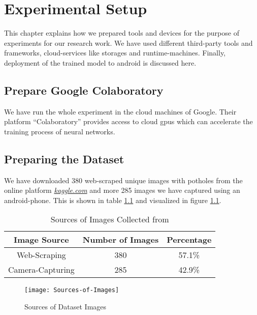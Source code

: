 \chapter{Experimental Setup}
    This chapter explains how we prepared tools and devices for the purpose of experiments for our research work. We have used different third-party tools and frameworks, cloud-services like storages and runtime-machines. Finally, deployment of the trained model to android is discussed here.
        
    \section{Prepare Google Colaboratory}
        We have run the whole experiment in the cloud machines of Google. Their platform ``Colaboratory'' provides access to cloud \acrshort{gpu}s which can accelerate the training process of neural networks.
    
    \section{Preparing the Dataset}
        We have downloaded 380 web-scraped unique images with potholes from the online platform \href{https://kaggle.com}{\itshape{kaggle.com}} and more 285 images we have captured using an android-phone. This is shown in table \ref{tab:img_sources} and visualized in figure \ref{fig:image_sources}.
        
        \begin{table}[ht]
            \centering
            \begin{tabular}{|c|c|c|} \hline
                Image Source &  Number of Images & Percentage \\\hline\hline
                Web-Scraping & 380 & 57.1\% \\\hline
                Camera-Capturing & 285 & 42.9\% \\\hline
            \end{tabular}
            \caption{Sources of Images Collected from}
            \label{tab:img_sources}
        \end{table}
        
        \begin{figure}
            \centering
            \texttt{[image: Sources-of-Images]}
            \caption{Sources of Dataset Images}
            \label{fig:image_sources}
        \end{figure}
        
